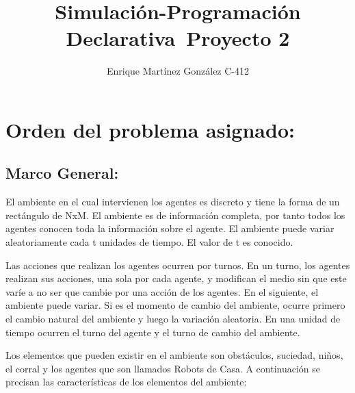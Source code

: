 \documentclass[titlepage,11pt]{scrartcl}
\title{	
    \normalfont\normalsize
	\vspace{25pt}
	{\huge Simulación-Programación Declarativa\ Proyecto 2}
	\vspace{12pt}
}
\author{\LARGE Enrique Martínez González C-412}
\date{}
\begin{document}
\maketitle

\section{Orden del problema asignado:}
\subsection{Marco General:}
El ambiente en el cual intervienen los agentes es discreto y tiene la forma de un rectángulo de NxM. El ambiente es de información completa, por tanto todos los agentes conocen toda la información sobre el agente. El ambiente puede variar aleatoriamente cada t unidades de tiempo. El valor de t es conocido.

Las acciones que realizan los agentes ocurren por turnos. En un turno, los agentes realizan sus acciones, una sola por cada agente, y modifican el medio sin que este varíe a no ser que cambie por una acción de los agentes. En el siguiente, el ambiente puede variar. Si es el momento de cambio del ambiente, ocurre primero el cambio natural del ambiente y luego la variación aleatoria. En una unidad de tiempo ocurren el turno del agente y el turno de cambio del ambiente.

Los elementos que pueden existir en el ambiente son obstáculos, suciedad, niños, el corral y los agentes que son llamados Robots de Casa. A continuación se precisan las características de los elementos del ambiente:
\end{document}
